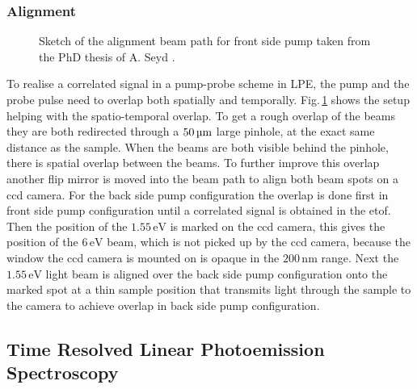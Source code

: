 \documentclass[a4paper,12pt,twoside]{article}
\begin{document}
\subsubsection{Alignment}
\label{Achap}
	\begin{figure}[H]
        \caption{Sketch of the alignment beam path for front side pump taken from the PhD thesis of A. Seyd \cite{Syed2018}.}
		    \label{align}
	\end{figure}
To realise a correlated signal in a pump-probe scheme in \gls{LPE}, the pump and the probe pulse need to overlap both spatially and temporally. Fig.\,\ref{align} shows the setup helping with the spatio-temporal overlap. To get a rough overlap of the beams they are both redirected through a $50\,\mathrm{\mbox{\textmu m}}$ large pinhole, at the exact same distance as the sample. When the beams are both visible behind the pinhole, there is spatial overlap between the beams. To further improve this overlap another flip mirror is moved into the beam path to align both beam spots on a \gls{ccd} camera. For the back side pump configuration the overlap is done first in front side pump configuration until a correlated signal is obtained in the \gls{etof}. Then the position of the $1.55\,\mathrm{eV}$ is marked on the \gls{ccd} camera, this gives the position of the $6\,\mathrm{eV}$ beam, which is not picked up by the \gls{ccd} camera, because the window the \gls{ccd} camera is mounted on is opaque in the $200\,\mathrm{nm}$ range. Next the $1.55\,\mathrm{eV}$ light beam is aligned over the back side pump configuration onto the marked spot at a thin sample position that transmits light through the sample to the camera to achieve overlap in back side pump configuration.
\subsection{Time Resolved Linear Photoemission Spectroscopy} 
\end{document}
